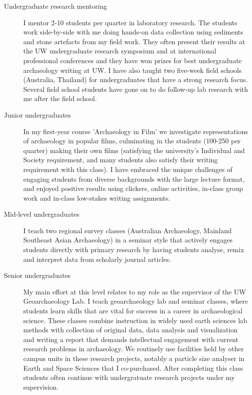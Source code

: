 \documentclass[11pt,article,oneside]{memoir}
\begin{document}
\begin{description}

\item[Undergraduate research mentoring] I mentor 2-10 students per quarter in laboratory research. The students work side-by-side with me doing hands-on data collection using sediments and stone artefacts from my field work. They often present their results at the UW undergraduate research symposium and at international professional conferences and they have won prizes for best undergraduate archaeology writing at UW. I have also taught two five-week field schools (Australia, Thailand) for undergraduates that have a strong research focus. Several field school students have gone on to do follow-up lab research with me after the field school.

\item[Junior undergraduates] In my first-year course 'Archaeology in Film' we investigate representations of archaeology in popular films, culminating in the students (100-250 per quarter) making their own films (satisfying the university's Individual and Society requirement, and many students also satisfy their writing requirement with this class). I have embraced the unique challenges of engaging students from diverse backgrounds with the large lecture format, and enjoyed positive results using clickers, online activities, in-class group work and in-class low-stakes writing assignments.
  
\item[Mid-level undergraduates] I teach two regional survey classes (Australian Archaeology, Mainland Southeast Asian Archaeology) in a seminar style that actively engages students directly with primary research by having students analyse, remix and interpret data from scholarly journal articles. 
  
\item[Senior undergraduates] My main effort at this level relates to my role as the supervisor of the UW Geoarchaeology Lab. I teach geoarchaeology lab and seminar classes, where students learn skills that are vital for success in a career in archaeological science. These classes combine instruction in widely used earth sciences lab methods with collection of original data, data analysis and visualization and writing a report that demands intellectual engagement with current research problems in archaeology. We routinely use facilities held by other campus units in these research projects, notably a particle size analyser in Earth and Space Sciences that I co-purchased. After completing this class students often continue with undergratuate research projects under my supervision. 


\end{description}
\end{document}
